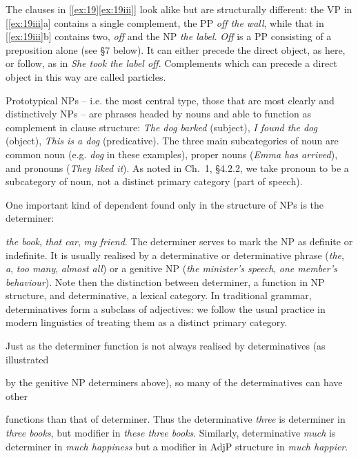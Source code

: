The clauses in [\ref{ex:19}\ref{ex:19iii}] look alike but are structurally different: the VP in [\ref{ex:19iii}a] contains a single complement, the PP \textit{off the wall}, while that in [\ref{ex:19iii}b] contains two, \textit{off} and the NP \textit{the label}. \textit{Off} is a PP consisting of a preposition alone (see §7 below). It can either precede the direct object, as here, or follow, as in \textit{She took the label off}. Complements which can precede a direct object in this way are called {particles}.


Prototypical NPs -- i.e. the most central type, those that are most clearly and distinctively NPs -- are phrases headed by nouns and able to function as complement in clause structure: \textit{The dog barked} (subject), \textit{I found the dog} (object), \textit{This is a dog} (predicative). The three main subcategories of noun are {common noun} (e.g. \textit{dog} in these examples), {proper nouns} (\textit{Emma has arrived}), and {pronouns} (\textit{They liked it}). As noted in Ch.~1, §4.2.2, we take pronoun to be a subcategory of noun, not a distinct primary category (part of speech).

One important kind of dependent found only in the structure of NPs is the {determiner}: {\textit{the book}, \textit{that car}, \textit{my friend}. The determiner serves to mark the NP as definite or indefinite. It is usually realised by a determinative or determinative phrase (\textit{the}, \textit{a}, \textit{too many}, \textit{almost all}) or a genitive NP (\textit{the minister's speech}, \textit{one member's behaviour}). Note then the distinction between {determiner}, a function in NP structure, and {determinative}, a lexical category. In traditional grammar, determinatives form a subclass of adjectives: we follow the usual practice in modern linguistics of treating them as a distinct primary category.

Just as the determiner function is not always realised by determinatives (as illustrated} by the genitive NP determiners above), so many of the determinatives can have other



\noindent functions than that of determiner. Thus the determinative \textit{three} is determiner in \textit{three books}, but modifier in \textit{these three books}. Similarly, determinative \textit{much} is determiner in \textit{much happiness} but a modifier in AdjP structure in \textit{much happier}.

